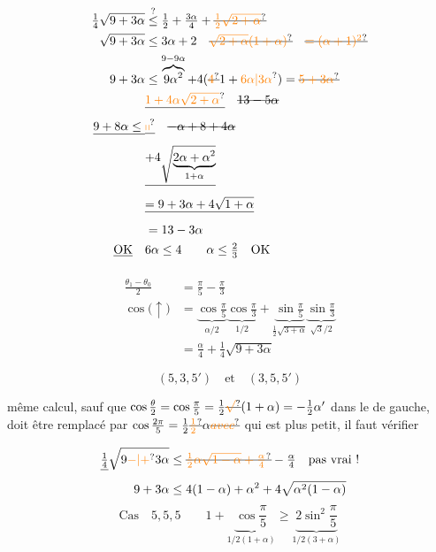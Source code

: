 \[
\begin{aligned}
 \tfrac14\sqrt{9+3\alpha}&\overset?{\leq}\tfrac12+\tfrac{3\alpha}4
 +\deleted{\unsure{\tfrac12\sqrt{2+\alpha}}}\\
 \sqrt{9+3\alpha}&\leq 3\alpha+2\quad
 \deleted{\unsure{\sqrt{2+\alpha}(1+\alpha)}}\quad \deleted{\unsure{=(\alpha+1)^2}}\\
 9+3\alpha&\leq\overbrace{9\alpha^2}^{9-9\alpha}+4(\deleted{\unsure{4}}1+\unsure{6\alpha|3\alpha})
 =\deleted{\unsure{5+3\alpha}}\\
 &\deleted{\unsure{1+4\alpha\sqrt{2+\alpha}}}\quad \deleted{13-5\alpha}\\
 \deleted{9+8\alpha\leq{}}&\deleted{\unsure{\shortparallel}}\quad\deleted{-\alpha+8+4\alpha}\\
 &\deleted{+4\sqrt{\underbrace{2\alpha+\alpha^2}_{1+\alpha}}}\\
 &\deleted{=9+3\alpha+4\sqrt{1+\alpha}}\\
 &=13-3\alpha\\
 \deleted{\text{OK}}\quad&6\alpha\leq4\qquad\alpha\leq\tfrac23\quad\text{OK}
\end{aligned}
\]

\[
\begin{aligned}
 \frac{\theta_1-\theta_0}{2}&=\frac{\pi}{5}-\frac{\pi}{3}\\
 \cos\bigl(\uparrow\bigr)&=\underbrace{\cos\frac{\pi}{5}}_{\alpha/2}
 \underbrace{\cos\frac{\pi}{3}}_{1/2}
 +\underbrace{\sin\frac{\pi}{5}}_{\frac12\sqrt{3+\alpha}}
 \underbrace{\sin\frac{\pi}{3}}_{\sqrt3/2}\\
 &=\frac{\alpha}{4}+\frac14\sqrt{9+3\alpha}
\end{aligned}
\]


\[
 \boxed{(5,3,5')}\quad\text{et}\quad\boxed{(3,5,5')}
\]


même calcul, sauf que 
$\cos\frac{\theta}{2}=\cos\frac{\pi}{5}=\tfrac12\deleted{\unsure{\sqrt{\vphantom1}}}(1+\alpha)=-\tfrac12\alpha'$
dans le  de gauche, doit être remplacé par
$\cos\frac{2\pi}{5}=\frac12\deleted{\unsure{\tfrac12}}\alpha\deleted{\unsure{avec}}$
 
qui est plus petit, il faut vérifier

\[
\begin{aligned}
 \deleted{\tfrac14}\sqrt{9\unsure{-|+}3\alpha}
 &\leq\deleted{\unsure{\tfrac12\alpha\sqrt{1-\alpha}+\tfrac{\alpha}4}}-\tfrac{\alpha}{4}
 \quad\text{pas vrai !}\\
 9+3\alpha&\leq4(1-\alpha)+\alpha^2+4\sqrt{\alpha^2(1-\alpha)}
\end{aligned}
\]
\[
 \text{Cas}\quad\boxed{5,5,5}\qquad
 1+\underbrace{\cos\frac{\pi}{5}}_{1/2(1+\alpha)}
 \geq\underbrace{2\sin^2\frac{\pi}{5}}_{1/2(3+\alpha)}
\]

